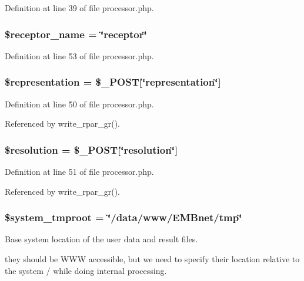 Definition at line 39 of file processor.php.
\subsubsection{\setlength{\rightskip}{0pt plus 5cm}\$receptor\_\-name = \char`\"{}receptor\char`\"{}}\label{processor_8php_a7}




Definition at line 53 of file processor.php.
\subsubsection{\setlength{\rightskip}{0pt plus 5cm}\$representation = \$\_\-POST[\char`\"{}representation\char`\"{}]}\label{processor_8php_a5}




Definition at line 50 of file processor.php.

Referenced by write\_\-rpar\_\-gr().
\subsubsection{\setlength{\rightskip}{0pt plus 5cm}\$resolution = \$\_\-POST[\char`\"{}resolution\char`\"{}]}\label{processor_8php_a6}




Definition at line 51 of file processor.php.

Referenced by write\_\-rpar\_\-gr().
\subsubsection{\setlength{\rightskip}{0pt plus 5cm}\$system\_\-tmproot = \char`\"{}/data/www/EMBnet/tmp\char`\"{}}\label{processor_8php_a0}


Base system location of the user data and result files. 

they should be WWW accessible, but we need to specify their location relative to the system / while doing internal processing. 

